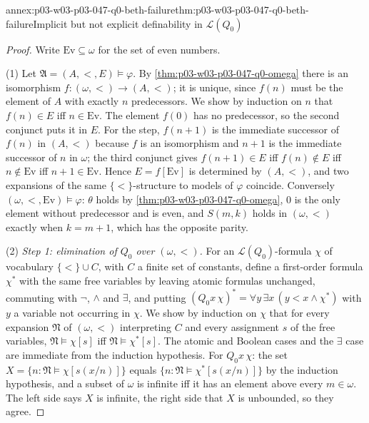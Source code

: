 \begin{annexitem}{annex:p03-w03-p03-047-q0-beth-failure}{thm:p03-w03-p03-047-q0-beth-failure}{Implicit but not explicit definability in \(\mathscr L(Q_0)\)}
\begin{proof}
Write \(\mathrm{Ev}\subseteq\omega\) for the set of even numbers.

(1) Let \(\mathfrak A=(A,<,E)\models\varphi\).  By
\cref{thm:p03-w03-p03-047-q0-omega} there is an isomorphism
\(f:(\omega,<)\to(A,<)\); it is unique, since \(f(n)\) must be the element
of \(A\) with exactly \(n\) predecessors.  We show by induction on \(n\)
that \(f(n)\in E\) iff \(n\in\mathrm{Ev}\).  The element \(f(0)\) has no
predecessor, so the second conjunct puts it in \(E\).  For the step,
\(f(n+1)\) is the immediate successor of \(f(n)\) in \((A,<)\) because
\(f\) is an isomorphism and \(n+1\) is the immediate successor of \(n\) in
\(\omega\); the third conjunct gives \(f(n+1)\in E\) iff \(f(n)\notin E\)
iff \(n\notin\mathrm{Ev}\) iff \(n+1\in\mathrm{Ev}\).  Hence
\(E=f[\mathrm{Ev}]\) is determined by \((A,<)\), and two expansions of the
same \(\{<\}\)-structure to models of \(\varphi\) coincide.  Conversely
\((\omega,<,\mathrm{Ev})\models\varphi\): \(\theta\) holds by
\cref{thm:p03-w03-p03-047-q0-omega}, \(0\) is the only element without
predecessor and is even, and \(S(m,k)\) holds in \((\omega,<)\) exactly when
\(k=m+1\), which has the opposite parity.

(2) \emph{Step 1: elimination of \(Q_0\) over \((\omega,<)\).}  For an
\(\mathscr L(Q_0)\)-formula \(\chi\) of vocabulary \(\{<\}\cup C\), with
\(C\) a finite set of constants, define a first-order formula \(\chi^*\) with
the same free variables by leaving atomic formulas unchanged, commuting with
\(\neg\), \(\land\) and \(\exists\), and putting
\((Q_0x\,\chi)^*=\forall y\,\exists x\,(y<x\land\chi^*)\) with \(y\) a
variable not occurring in \(\chi\).  We show by induction on \(\chi\) that
for every expansion \(\mathfrak N\) of \((\omega,<)\) interpreting \(C\) and
every assignment \(s\) of the free variables,
\(\mathfrak N\models\chi[s]\) iff \(\mathfrak N\models\chi^*[s]\).  The
atomic and Boolean cases and the \(\exists\) case are immediate from the
induction hypothesis.  For \(Q_0x\,\chi\): the set
\(X=\{n:\mathfrak N\models\chi[s(x/n)]\}\) equals
\(\{n:\mathfrak N\models\chi^*[s(x/n)]\}\) by the induction hypothesis, and
a subset of \(\omega\) is infinite iff it has an element above every
\(m\in\omega\).  The left side says \(X\) is infinite, the right side that
\(X\) is unbounded, so they agree.


\end{proof}
\end{annexitem}
